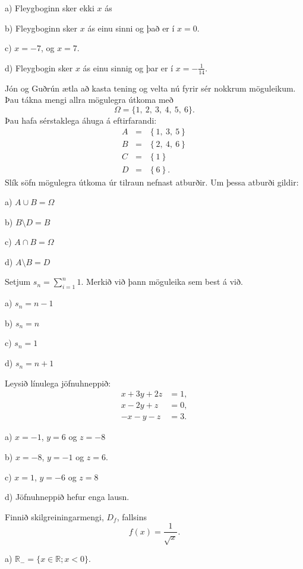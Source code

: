 a) Fleygboginn sker ekki $x$ ás

b) Fleygboginn sker $x$ ás einu sinni og það er í $x=0$. %

c) $x=-7$, og $x=7$.

d) Fleygbogin sker $x$ ás einu sinnig og þar er í $x=- \frac{1}{14}$.


\item Jón og Guðrún ætla að kasta tening og velta nú fyrir sér nokkrum möguleikum. Þau tákna mengi
allra mögulegra útkoma með
$$
\Omega=\{1,\ 2,\ 3,\ 4,\ 5,\ 6\}.
$$
Þau hafa sérstaklega áhuga á eftirfarandi:
\begin{eqnarray*}
A&=&\left \{ 1,\ 3,\ 5 \right \} \\
B&=&\left \{ 2,\ 4,\ 6  \right \} \\
C&=&\left \{ 1 \right \} \\
D&=&\left \{ 6 \right \}.
\end{eqnarray*}
Slík söfn mögulegra útkoma úr tilraun nefnast atburðir. Um þessa atburði gildir:

a) $A\cup B=\Omega$ %

b) $B\setminus D=B $

c) $A\cap B=\Omega$

d) $A\setminus B=D$


\item Setjum $s_n = \sum_{i=1}^n 1$. Merkið við þann möguleika sem best á við.
\newpage

a) $s_n = n-1$

b) $s_n = n$ %

c) $s_n = 1$

d) $s_n = n+1$


\item Leysið línulega jöfnuhneppið:
\begin{align*}
x + 3y + 2z &= 1, \\
x - 2y + z &= 0, \\
-x - y - z &= 3.
\end{align*}

a) $x = -1$, $y = 6$ og $z = -8$

b) $x = -8$, $y = -1$ og $z = 6$. %

c) $x = 1$, $y = -6$ og $z = 8$

d) Jöfnuhneppið hefur enga lausn.


\item Finnið skilgreiningarmengi, $D_f$, fallsins $$f(x) = \frac{1}{\sqrt x}.$$

a) $\mathbb{R}_- = \{ x \in \mathbb{R} ; x<0\}$.


